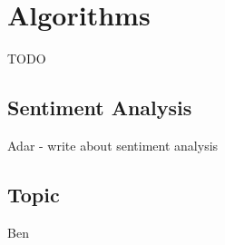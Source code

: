 \section{Algorithms}
TODO

\subsection{Sentiment Analysis}
Adar - write about sentiment analysis


\subsection{Topic}
Ben